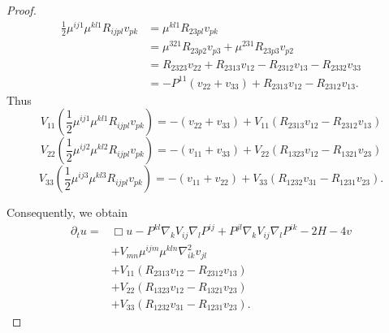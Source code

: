 \documentclass{amsart}
\theoremstyle{definition}
\theoremstyle{remark}
\numberwithin{equation}{section}
\begin{document}
\begin{proof}
\begin{align*}
\frac{1}{2}\mu^{ij1}\mu^{kl1}R_{ijpl}v_{pk}&=\mu^{kl1}R_{23pl}v_{pk}\\
&=\mu^{321}R_{23p2}v_{p3}+\mu^{231}R_{23p3}v_{p2}\\
&=R_{2323}v_{22}+R_{2313}v_{12}-R_{2312}v_{13}-R_{2332}v_{33}\\
&=-P^{11}(v_{22}+v_{33})+R_{2313}v_{12}-R_{2312}v_{13}.
\end{align*}
Thus
\[V_{11}\left(\frac{1}{2}\mu^{ij1}\mu^{kl1}R_{ijpl}v_{pk}\right)=-(v_{22}+v_{33})+V_{11}\left(R_{2313}v_{12}-R_{2312}v_{13}\right)\]
\[V_{22}\left(\frac{1}{2}\mu^{ij2}\mu^{kl2}R_{ijpl}v_{pk}\right)=-(v_{11}+v_{33})+V_{22}\left(R_{1323}v_{12}-R_{1321}v_{23}\right)\]
\[V_{33}\left(\frac{1}{2}\mu^{ij3}\mu^{kl3}R_{ijpl}v_{pk}\right)=-(v_{11}+v_{22})+V_{33}\left(R_{1232}v_{31}-R_{1231}v_{23}\right).\]

Consequently, we obtain
\begin{align*}
\partial_t u=&\Box u-P^{kl}\nabla_k V_{ij}\nabla_l P^{ij}+P^{jl}\nabla_kV_{ij}\nabla_lP^{ik}-2H-4v\\
&+V_{mn}\mu^{ijm}\mu^{kln}\nabla^2_{ik}v_{jl}\\
&+V_{11}\left(R_{2313}v_{12}-R_{2312}v_{13}\right)\\
&+V_{22}\left(R_{1323}v_{12}-R_{1321}v_{23}\right)\\
&+V_{33}\left(R_{1232}v_{31}-R_{1231}v_{23}\right).
\end{align*}
\end{proof}
\end{document}
